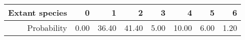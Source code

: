 \begin{table}[ht]
\centering
\begin{tabular}{rrrrrrrr}
  \hline
Extant species & 0 & 1 & 2 & 3 & 4 & 5 & 6 \\ 
  \hline
Probability & 0.00 & 36.40 & 41.40 & 5.00 & 10.00 & 6.00 & 1.20 \\ 
   \hline
\end{tabular}
\end{table}
